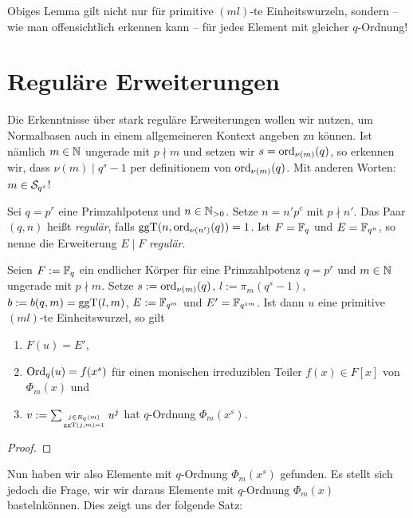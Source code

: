 \begin{bemerkung}
  Obiges Lemma gilt nicht nur für primitive $(ml)$-te Einheitswurzeln, sondern
  -- wie man offensichtlich erkennen kann -- für jedes Element mit gleicher
  $q$-Ordnung!
\end{bemerkung}




\section{Reguläre Erweiterungen}

Die Erkenntnisse über stark reguläre Erweiterungen wollen wir nutzen, um
Normalbasen auch in einem allgemeineren Kontext angeben zu können. Ist nämlich
$m\in\N$ ungerade mit $p\nmid m$ und setzen wir $s = \ord_{\nu(m)}(q)$, 
so erkennen wir, dass $\nu(m) \mid q^s-1$ per definitionem von
$\ord_{\nu(m)}(q)$. Mit anderen Worten: $m \in \S_{q^s}$! 

\begin{definition}[regulär]
  Sei $q = p^r$ eine Primzahlpotenz und $n\in \N_{>0}$. Setze 
  $n = n' p^c$ mit $p\nmid n'$. Das Paar $(q,n)$ heißt \emph{regulär}, falls
  $\ggT(n, \ord_{\nu(n')}(q)) = 1$. 
  Ist $F = \F_q$ und $E = \F_{q^n}$, so nenne die Erweiterung $E\mid F$ 
  \emph{regulär}.
\end{definition}

\begin{satz}
  \label{satz:konstruktion_q_ordnung_reg}
  Seien $F := \F_q$ ein endlicher Körper für eine Primzahlpotenz $q = p^r$ 
  und $m\in\N$ ungerade mit $p\nmid m$.
  Setze $s := \ord_{\nu(m)}(q)$, 
  $l := \pi_m(q^s-1)$, $b:= b(q,m) = \ggT(l,m)$, $E := \F_{q^m}$ und
  $E' = \F_{q^{sm}}$. Ist dann
  $u$ eine primitive $(ml)$-te Einheitswurzel, so gilt
  \begin{enumerate}
    \item $F(u) = E'$,
    \item $\Ord_q(u) = f(x^s)$ für einen monischen irreduziblen Teiler 
      $f(x) \in F[x]$ von $\Phi_m(x)$ und 
    \item $v := \sum_{j \in R_q(m)\atop \ggT(j,m)=1} 
      u^j$ hat $q$-Ordnung $\Phi_m(x^s)$.
  \end{enumerate}
\end{satz}
\begin{proof}
  \TODO
\end{proof}

Nun haben wir also Elemente mit $q$-Ordnung $\Phi_m(x^s)$ gefunden. Es stellt
sich jedoch die Frage, wir wir daraus Elemente mit $q$-Ordnung $\Phi_m(x)$ 
\glqq basteln\grqq können. Dies zeigt uns der folgende Satz:

